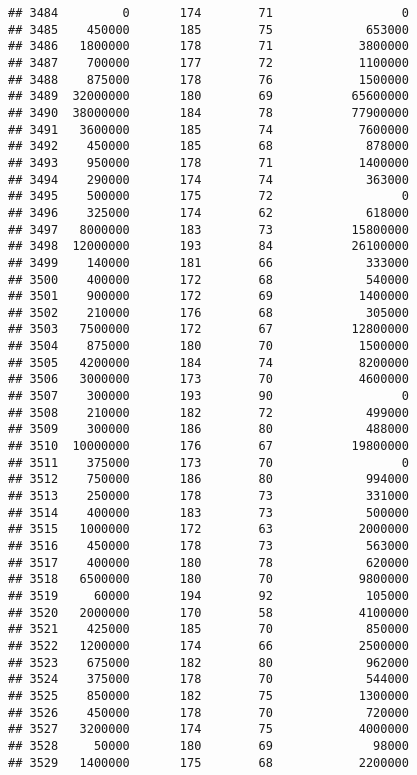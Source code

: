 \documentclass[
]{article}
\begin{document}
\begin{verbatim}
## 3484         0       174        71                  0
## 3485    450000       185        75             653000
## 3486   1800000       178        71            3800000
## 3487    700000       177        72            1100000
## 3488    875000       178        76            1500000
## 3489  32000000       180        69           65600000
## 3490  38000000       184        78           77900000
## 3491   3600000       185        74            7600000
## 3492    450000       185        68             878000
## 3493    950000       178        71            1400000
## 3494    290000       174        74             363000
## 3495    500000       175        72                  0
## 3496    325000       174        62             618000
## 3497   8000000       183        73           15800000
## 3498  12000000       193        84           26100000
## 3499    140000       181        66             333000
## 3500    400000       172        68             540000
## 3501    900000       172        69            1400000
## 3502    210000       176        68             305000
## 3503   7500000       172        67           12800000
## 3504    875000       180        70            1500000
## 3505   4200000       184        74            8200000
## 3506   3000000       173        70            4600000
## 3507    300000       193        90                  0
## 3508    210000       182        72             499000
## 3509    300000       186        80             488000
## 3510  10000000       176        67           19800000
## 3511    375000       173        70                  0
## 3512    750000       186        80             994000
## 3513    250000       178        73             331000
## 3514    400000       183        73             500000
## 3515   1000000       172        63            2000000
## 3516    450000       178        73             563000
## 3517    400000       180        78             620000
## 3518   6500000       180        70            9800000
## 3519     60000       194        92             105000
## 3520   2000000       170        58            4100000
## 3521    425000       185        70             850000
## 3522   1200000       174        66            2500000
## 3523    675000       182        80             962000
## 3524    375000       178        70             544000
## 3525    850000       182        75            1300000
## 3526    450000       178        70             720000
## 3527   3200000       174        75            4000000
## 3528     50000       180        69              98000
## 3529   1400000       175        68            2200000

\end{verbatim}
\end{document}
